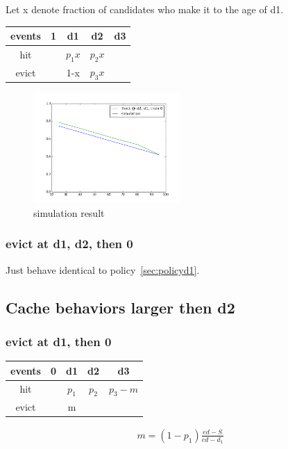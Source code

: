 \documentclass[12pt, letterpaper]{article}
\begin{document}
Let x denote fraction of candidates who make it to the age of d1.

\begin{center}
\begin{tabular}{c | c c c c}
\hline
events & 1 & d1 & d2 & d3 \\
\hline
hit & & $p_1 x$ & $p_2 x$ &  \\
evict & & 1-x & $p_3 x$ & 
\end{tabular}
\end{center}

\begin{figure}[H]
\centering
\includegraphics[width=0.5\textwidth]{sim_d2_d1.png}
\caption{simulation result}
\end{figure}

\subsubsection{evict at d1, d2, then 0}

Just behave identical to policy~\ref{sec:policyd1}.

\subsection{Cache behaviors larger then d2}

\subsubsection{evict at d1, then 0}

\begin{center}
\begin{tabular}{c | c c c c}
\hline
events & 0 & d1 & d2 & d3 \\
\hline
hit & & $p_1$& $p_2$ & $p_3-m$ \\
evict & & m &  & 
\end{tabular}
\end{center}

\begin{equation}
\begin{aligned}
m  = (1-p_1) \frac{ed - S}{ed - d_1}
\end{aligned}
\end{equation}
\end{document}
